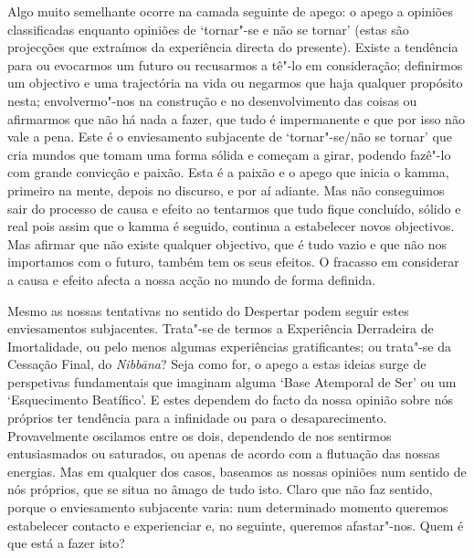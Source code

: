 Algo muito semelhante ocorre na camada seguinte de apego: o apego a opiniões
classificadas enquanto opiniões de `tornar"-se e não se tornar' (estas são
projecções que extraímos da experiência directa do presente). Existe a tendência
para ou evocarmos um futuro ou recusarmos a tê"-lo em consideração; definirmos
um objectivo e uma trajectória na vida ou negarmos que haja qualquer propósito
nesta; envolvermo"-nos na construção e no desenvolvimento das coisas ou
afirmarmos que não há nada a fazer, que tudo é impermanente e que por isso não
vale a pena. Este é o enviesamento subjacente de `tornar"-se/não se tornar' que
cria mundos que tomam uma forma sólida e começam a girar, podendo fazê"-lo com
grande convicção e paixão. Esta é a paixão e o apego que inicia o kamma,
primeiro na mente, depois no discurso, e por aí adiante. Mas não conseguimos
sair do processo de causa e efeito ao tentarmos que tudo fique concluído, sólido
e real pois assim que o kamma é seguido, continua a estabelecer novos
objectivos. Mas afirmar que não existe qualquer objectivo, que é tudo vazio e
que não nos importamos com o futuro, também tem os seus efeitos. O fracasso em
considerar a causa e efeito afecta a nossa acção no mundo de forma definida.

Mesmo as nossas tentativas no sentido do Despertar podem seguir estes
enviesamentos subjacentes. Trata"-se de termos a Experiência Derradeira de
Imortalidade, ou pelo menos algumas experiências gratificantes; ou trata"-se da
Cessação Final, do \emph{Nibbāna}? Seja como for, o apego a estas ideias surge
de perspetivas fundamentais que imaginam alguma `Base Atemporal de Ser' ou um
`Esquecimento Beatífico'. E estes dependem do facto da nossa opinião sobre nós
próprios ter tendência para a infinidade ou para o desaparecimento.
Provavelmente oscilamos entre os dois, dependendo de nos sentirmos entusiasmados
ou saturados, ou apenas de acordo com a flutuação das nossas energias. Mas em
qualquer dos casos, baseamos as nossas opiniões num sentido de nós próprios, que
se situa no âmago de tudo isto. Claro que não faz sentido, porque o enviesamento
subjacente varia: num determinado momento queremos estabelecer contacto e
experienciar e, no seguinte, queremos afastar"-nos. Quem é que está a fazer
isto?

